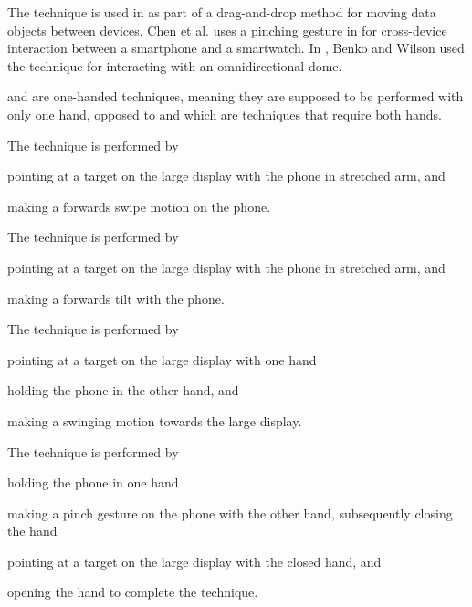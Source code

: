 The \pinch technique is used in \cite{Ikematsu:2015} as part of a drag-and-drop method for moving data objects between devices.
Chen et al. uses a pinching gesture in \cite{Chen:2014} for cross-device interaction between a smartphone and a smartwatch. 
In \cite{Benko:2010}, Benko and Wilson used the \pinch technique for interacting with an omnidirectional dome.

\swipe and \tilt are one-handed techniques, meaning they are supposed to be performed with only one hand, opposed to \throw and \pinch which are techniques that require both hands.

The \swipe technique is performed by 
\begin{enumerate*}[label=\itshape\arabic*\upshape)]
	\item{pointing at a target on the large display with the phone in stretched arm, and}
	\item{making a forwards swipe motion on the phone.}
\end{enumerate*}

The \tilt technique is performed by 
\begin{enumerate*}[label=\itshape\arabic*\upshape)]
	\item{pointing at a target on the large display with the phone in stretched arm, and}
	\item{making a forwards tilt with the phone.}
\end{enumerate*}

The \throw technique is performed by 
\begin{enumerate*}[label=\itshape\arabic*\upshape)]
	\item{pointing at a target on the large display with one hand} 
	\item{holding the phone in the other hand, and}
	\item{making a swinging motion towards the large display.}
\end{enumerate*}

The \pinch technique is performed by 
\begin{enumerate*}[label=\itshape\arabic*\upshape)]
	\item{holding the phone in one hand} 
	\item{making a pinch gesture on the phone with the other hand, subsequently closing the hand}
	\item{pointing at a target on the large display with the closed hand, and}
	\item{opening the hand to complete the technique.}
\end{enumerate*}